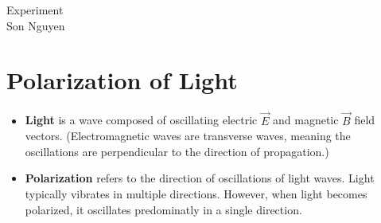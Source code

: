 \documentclass{article}
\begin{document}
\begin{center}
	\LARGE{Experiment}\\[1em]
	\large Son Nguyen\\[1em]
\end{center}
\section{Polarization of Light}
\begin{itemize}
	\item \textbf{Light} is a wave composed of oscillating electric \(\vec{E}\) and magnetic \(\vec{B}\) field vectors. (Electromagnetic waves are transverse waves, meaning the oscillations are perpendicular to the direction of propagation.)
	\item \textbf{Polarization} refers to the direction of oscillations of light waves. Light typically vibrates in multiple directions. However, when light becomes polarized, it oscillates predominatly in a single direction.
\end{itemize}
\end{document}
